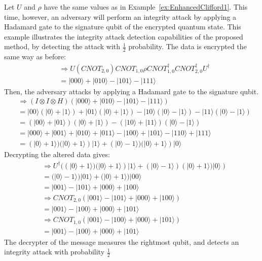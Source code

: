 \begin{example}
\label{ex:IntegrityAttackEnhancedClifford3}
	Let $U$ and $\rho$ have the same values as in Example~\ref{ex:EnhancedClifford1}. This time, however, an adversary will perform an integrity attack by applying a Hadamard gate to the signature qubit of the encrypted quantum state. This example illustrates the integrity attack detection capabilities of the proposed method, by detecting the attack with $\frac{1}{2}$ probability. The data is encrypted the same way as before:
	\begin{align}
	& \Rightarrow U (\mathit{CNOT}_{2,0})\mathit{CNOT}_{1,0}\rho \mathit{CNOT}_{1,0}^{\dagger}\mathit{CNOT}_{2,0}^{\dagger} U^{\dagger}\\
	&= |000\rangle + |010\rangle - |101\rangle - |111\rangle
	\end{align}
	Then, the adversary attacks by applying a Hadamard gate to the signature qubit.
	\begin{align}
	& \Rightarrow (I \otimes I \otimes H)(|000\rangle + |010\rangle - |101\rangle - |111\rangle)\\
	&= |00\rangle(|0\rangle + |1\rangle) + |01\rangle(|0\rangle + |1\rangle) - |10\rangle(|0\rangle - |1\rangle) - |11\rangle(|0\rangle - |1\rangle)\\
	&= (|00\rangle + |01\rangle)(|0\rangle + |1\rangle) - (|10\rangle + |11\rangle)(|0\rangle - |1\rangle)\\
	&= |000\rangle + |001\rangle + |010\rangle + |011\rangle - |100\rangle + |101\rangle - |110\rangle + |111\rangle\\
	&= (|0\rangle + 1\rangle)(|0\rangle + 1\rangle)|1\rangle + (|0\rangle - 1\rangle)(|0\rangle + 1\rangle)|0\rangle
	\end{align}
	Decrypting the altered data gives:
	\begin{align}
	& \Rightarrow U^{\dagger}((|0\rangle + 1\rangle)(|0\rangle + 1\rangle)|1\rangle + (|0\rangle - 1\rangle)(|0\rangle + 1\rangle)|0\rangle)\\
	&= (|0\rangle - 1\rangle)|01\rangle + (|0\rangle + 1\rangle)|00\rangle\\
	&= |001\rangle - |101\rangle + |000\rangle + |100\rangle\\
	& \Rightarrow \mathit{CNOT}_{2,0} (|001\rangle - |101\rangle + |000\rangle + |100\rangle)\\
	&= |001\rangle - |100\rangle + |000\rangle + |101\rangle\\
	& \Rightarrow \mathit{CNOT}_{1,0} (|001\rangle - |100\rangle + |000\rangle + |101\rangle)\\
	&= |001\rangle - |100\rangle + |000\rangle + |101\rangle
	\end{align}
The decrypter of the message measures the rightmost qubit, and detects an integrity attack with probability $\frac{1}{2}$
\end{example}
